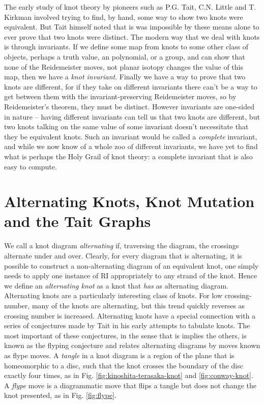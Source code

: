 \documentclass[12pt]{report}
\begin{document}
The early study of knot theory by pioneers such as P.G. Tait, C.N. Little and T. Kirkman involved trying to find, by hand, some way to show two knots were equivalent. But Tait himself noted that is was impossible by these means alone to ever prove that two knots were distinct. The modern way that we deal with knots is through invariants. If we define some map from knots to some other class of objects, perhaps a truth value, an polynomial, or a group, and can show that none of the Reidemeister moves, not planar isotopy changes the value of this map, then we have a \textit{knot invariant}. Finally we have a way to prove that two knots are different, for if they take on different invariants there can't be a way to get between them with the invariant-preserving Reidemeister moves, so by Reidemeister's theorem, they must be distinct. However invariants are one-sided in nature -- having different invariants can tell us that two knots are different, but two knots talking on the same value of some invariant doesn't necessitate that they be equivalent knots. Such an invariant would be called a \textit{complete} invariant, and while we now know of a whole zoo of different invariants, we have yet to find what is perhaps the Holy Grail of knot theory: a complete invariant that is also easy to compute.

\section{Alternating Knots, Knot Mutation and the Tait Graphs}
We call a knot diagram \textit{alternating} if, traversing the diagram, the crossings alternate under and over. Clearly, for every diagram that is alternating, it is possible to construct a non-alternating diagram of an equivalent knot, one simply needs to apply one instance of RI appropriately to any strand of the knot. Hence we define an \textit{alternating knot} as a knot that \textit{has} as alternating diagram. Alternating knots are a particularly interesting class of knots. For low crossing-number, many of the knots are alternating, but this trend quickly reverses as crossing number is increased. Alternating knots have a special connection with a series of conjectures made by Tait in his early attempts to tabulate knots. The most important of these conjectures, in the sense that is implies the others, is known as the flyping conjecture and relates alternating diagrams by moves known as flype moves. A \textit{tangle} in a knot diagram is a region of the plane that is homeomorphic to a disc, such that the knot crosses the boundary of the disc exactly four times, as in Fig. \ref{fig:kinoshita-terasaka-knot} and \ref{fig:conway-knot}. A \textit{flype} move is a diagrammatic move that flips a tangle but does not change the knot presented, as in Fig. \ref{fig:flype}.
\end{document}

